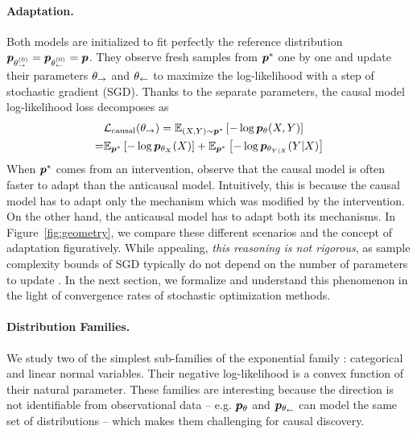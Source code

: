 \paragraph{Adaptation.}
Both models are initialized to fit perfectly the reference distribution $\bm{p}_{\theta_\rightarrow^{(0)}} = \bm{p}_{\theta_\leftarrow^{(0)}} = \bm{p}$.
They observe fresh samples from $\bm{p}^*$ one by one and update their parameters $\theta_\rightarrow$ and $\theta_\leftarrow$  to maximize the log-likelihood with a step of stochastic gradient (SGD).
Thanks to the separate parameters, the causal model log-likelihood loss decomposes as
\begin{align}
    &  \cL_\text{causal}(\causalvar)
    = \expect[(X,Y) \sim \ptransfer]{-\log \pmodel(X,Y)}\nonumber
    \\ = & \expect[\ptransfer]{-\log \ptrue_{\theta_X}(X)} + \expect[\ptransfer]{-\log \ptrue_{\theta_{Y|X}}(Y|X)}
    \label{eq:causal_loss}
\end{align}
When $\bm{p}^*$ comes from an intervention, \citet{bengio2019meta} observe that the causal model is often faster to adapt than the anticausal model.
Intuitively, this is because the causal model has to adapt only the mechanism which was modified by the intervention.
On the other hand, the anticausal model has to adapt both its mechanisms. In Figure~\ref{fig:geometry}, we compare these different scenarios and the concept of adaptation figuratively.
While appealing, \emph{this reasoning is not rigorous}, as sample complexity bounds of SGD typically do not depend on the number of parameters to update \citep[Th. 6.2 \& 6.3]{bubeck2015convex}.
In the next section, we formalize and understand this phenomenon in the light of convergence rates of stochastic optimization methods.

\paragraph{Distribution Families.} 
We study two of the simplest sub-families of the exponential family \citep{wainwright2008graphical}: categorical and linear normal variables.
Their negative log-likelihood is a convex function of their natural parameter.
These families are interesting because the direction is not identifiable from observational data  \citep[Ch.4]{peters2017elements}
-- e.g. $\bm{p}_{\theta}$ and $\bm{p}_{\theta_\leftarrow}$ can model the same set of distributions -- 
which makes them challenging for causal discovery.

